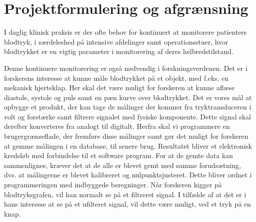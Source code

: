 \chapter{Projektformulering og afgrænsning}
I daglig klinisk praksis er der ofte behov for kontinuert at monitorere patienters blodtryk, i særdeleshed på intensive afdelinger samt operationsstuer, hvor blodtrykket er en vigtig parameter i monitorering af deres helbredstilstand.

Denne kontinuere monitorering er også nødvendig i forskningsverdenen. Det er i forskerens interesse at kunne måle blodtrykket på et objekt, med f.eks. en mekanisk hjerteklap. Her skal det være muligt for forskeren at kunne aflæse diastole, systole og puls samt en pæn kurve over blodtrykket. Det er vores mål at opbygge et produkt, der kan tage de målinger der kommer fra tryktransduceren i volt og forstærke samt filtrere signalet med fysiske komponente. Dette signal skal derefter konverteres fra analogt til digitalt. Herfra skal vi programmere en brugergrænseflade, der fremføre disse målinger samt gør det muligt for forskeren at gemme målingen i en database, til senere brug. Resultatet bliver et elektronisk kredsløb med forbindelse til et software program.
For at de gemte data kan sammenlignes, kræver det at de alle er blevet gemt med samme forudsætning, dvs. at målingerne er blevet kalibreret og nulpunktsjusteret. Dette bliver ordnet i programmeringen med indbyggede beregninger. Når forskeren kigger på blodtryksgrafen, vil han normalt se på et filtreret signal. I tilfælde af at det er i hans interesse at se på et ufilteret signal, vil dette være muligt, ved et tryk på en knap.

